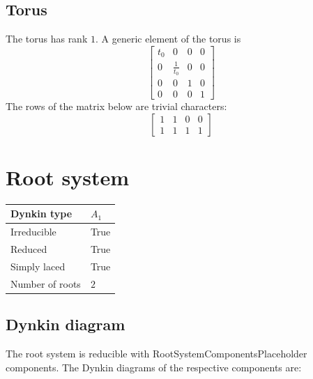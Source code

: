 \documentclass[11pt]{article}
\theoremstyle{definition}
\newif\ifrootsystemirreducible
\begin{document}
\subsection{Torus}

The torus has rank $1$. A generic element of the torus is
\[
\left[\begin{matrix}t_{0} & 0 & 0 & 0\\0 & \frac{1}{t_{0}} & 0 & 0\\0 & 0 & 1 & 0\\0 & 0 & 0 & 1\end{matrix}\right]
\]
The rows of the matrix below are trivial characters:
\[
\left[\begin{matrix}1 & 1 & 0 & 0\\1 & 1 & 1 & 1\end{matrix}\right]
\]

\newpage
\section{Root system}

\begin{tabular}{|l|l|}
	\hline
    Dynkin type & $A_1$ \\
	\hline
    Irreducible & True \\
	\hline
    Reduced & True \\
	\hline
	Simply laced & True \\
	\hline
	Number of roots & $2$ \\
	\hline
\end{tabular}

\subsection{Dynkin diagram}

\ifrootsystemirreducible
The root system is irreducible and has Dynkin diagram:
\else
The root system is reducible with RootSystemComponentsPlaceholder components. The Dynkin diagrams of the respective components are:
\fi

\end{document}
